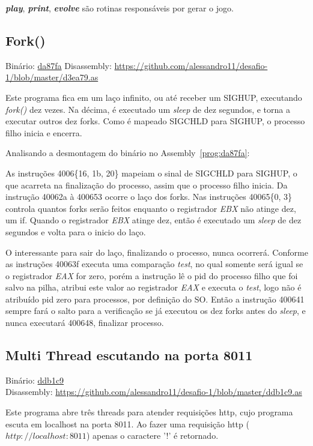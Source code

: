 \par\textbf{\emph{play}}, \textbf{\emph{print}},
\textbf{\emph{evolve}} são rotinas responsáveis por gerar o jogo.


\subsection{Fork()}
Binário: \href{https://s3.amazonaws.com/chaordic-desafio-cloud/da87fa}{da87fa}
Disassembly:
\href{https://github.com/alessandro11/desafio-1/blob/master/d3ea79.as}{https://github.com/alessandro11/desafio-1/blob/master/d3ea79.as}

Este programa fica em um laço infinito, ou até receber um SIGHUP,
executando \emph{fork()} dez vezes. Na décima, é executado um
\emph{sleep} de dez segundos, e torna a executar outros dez
forks. Como é mapeado SIGCHLD para SIGHUP, o processo filho inicia e
encerra.

Analisando a desmontagem do binário no Assembly~\ref{prog:da87fa}:



As instruções 4006\{16, 1b, 20\} mapeiam o sinal de SIGCHLD para
SIGHUP, o que acarreta na finalização do processo, assim que o processo
filho inicia. Da instrução 40062a à 400653 ocorre o laço dos
forks. Nas instruções 40065\{0, 3\} controla quantos forks serão
feitos enquanto o registrador \emph{EBX} não atinge dez, um if. Quando o
registrador \emph{EBX} atinge dez, então é executado um \emph{sleep} de dez
segundos e volta para o inicio do laço.

O interessante para sair do laço, finalizando o processo, nunca
ocorrerá. Conforme as instruções 40063f executa uma comparação
\emph{test}, no qual somente será igual se o registrador \emph{EAX} for zero,
porém a instrução lê o pid do processo filho que foi salvo na pilha,
atribui este valor ao registrador \emph{EAX} e executa o \emph{test}, logo
não é atribuído pid zero para processos, por definição do SO. Então a
instrução 400641 sempre fará o salto para a verificação se já executou
os dez forks antes do \emph{sleep}, e nunca executará 400648,
finalizar processo.


\subsection{Multi Thread escutando na porta 8011}
\noindent Binário: \href{https://s3.amazonaws.com/chaordic-desafio-cloud/ddb1c9}{ddb1c9}\\
Disassembly:
\href{https://github.com/alessandro11/desafio-1/blob/master/ddb1c9.as}{https://github.com/alessandro11/desafio-1/blob/master/ddb1c9.as}\\

\par Este programa abre três threads para atender requisições http,
cujo programa escuta em localhost na porta 8011. Ao fazer uma
requisição http ($http://localhost:8011$) apenas o caractere '!' é retornado.